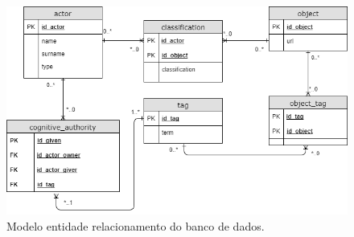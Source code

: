     \begin{figure}[ht]
    \centering
    \includegraphics[scale=0.5]{4-proposta/mer.png}
    \caption{Modelo entidade relacionamento do banco de dados.}
    \label{fig:mer}
    \end{figure}

